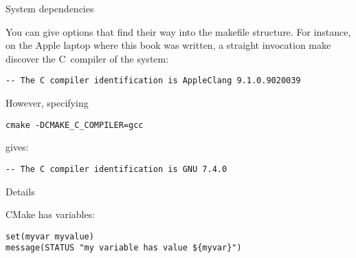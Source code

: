  {System dependencies}

You can give  options that find their way into the makefile
structure. For instance, on the Apple laptop where this book was
written, a straight invocation make  discover the C~compiler of the system:
\begin{lstlisting}
-- The C compiler identification is AppleClang 9.1.0.9020039
\end{lstlisting}
However, specifying
\begin{lstlisting}
cmake -DCMAKE_C_COMPILER=gcc
\end{lstlisting}
gives:
\begin{lstlisting}
-- The C compiler identification is GNU 7.4.0
\end{lstlisting}

 {Details}

CMake has variables:
\begin{lstlisting}
set(myvar myvalue)
message(STATUS "my variable has value ${myvar}")
\end{lstlisting}


